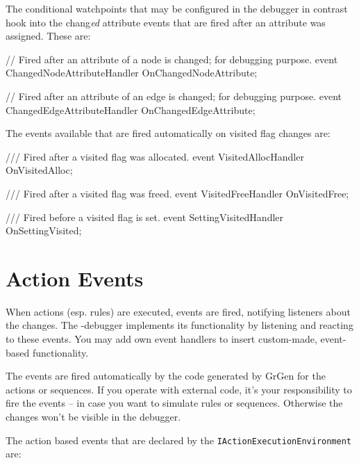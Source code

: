 The conditional watchpoints that may be configured in the debugger in contrast hook into the chang\emph{ed} attribute events that are fired after an attribute was assigned. These are:

\begin{csharplet}
// Fired after an attribute of a node is changed; for debugging purpose.
event ChangedNodeAttributeHandler OnChangedNodeAttribute;

// Fired after an attribute of an edge is changed; for debugging purpose.
event ChangedEdgeAttributeHandler OnChangedEdgeAttribute;
\end{csharplet}

The events available that are fired automatically on visited flag changes are:

\begin{csharplet}
/// Fired after a visited flag was allocated.
event VisitedAllocHandler OnVisitedAlloc;

/// Fired after a visited flag was freed.
event VisitedFreeHandler OnVisitedFree;

/// Fired before a visited flag is set.
event SettingVisitedHandler OnSettingVisited;
\end{csharplet}

\section{Action Events}\label{sec:actionevent}

When actions (esp. rules) are executed, events are fired, notifying listeners about the changes.
The \GrShell-debugger implements its functionality by listening and reacting to these events.
You may add own event handlers to insert custom-made, event-based functionality.

The events are fired automatically by the code generated by GrGen for the actions or sequences.
If you operate with external code, it's your responsibility to fire the events -- in case you want to simulate rules or sequences.
Otherwise the changes won't be visible in the debugger.

The action based events that are declared by the \texttt{IActionExecutionEnvironment} are:


